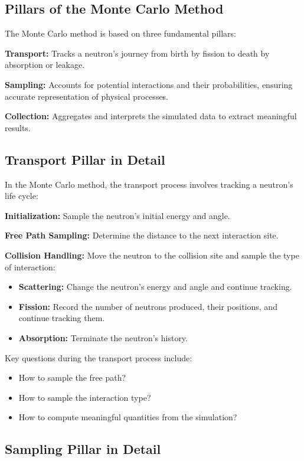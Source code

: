 \subsection{Pillars of the Monte Carlo Method}

The Monte Carlo method is based on three fundamental pillars:

\textbf{Transport:} Tracks a neutron's journey from birth by fission to death by absorption or leakage.

\textbf{Sampling:} Accounts for potential interactions and their probabilities, ensuring accurate representation of physical processes.

\textbf{Collection:} Aggregates and interprets the simulated data to extract meaningful results.

\subsection{Transport Pillar in Detail}

In the Monte Carlo method, the transport process involves tracking a neutron's life cycle:

\textbf{Initialization:} Sample the neutron's initial energy and angle.

\textbf{Free Path Sampling:} Determine the distance to the next interaction site.

\textbf{Collision Handling:} Move the neutron to the collision site and sample the type of interaction:
\begin{itemize}
\item \textbf{Scattering:} Change the neutron's energy and angle and continue tracking.
\item \textbf{Fission:} Record the number of neutrons produced, their positions, and continue tracking them.
\item \textbf{Absorption:} Terminate the neutron's history.
\end{itemize}

Key questions during the transport process include:
\begin{itemize}
\item How to sample the free path?
\item How to sample the interaction type?
\item How to compute meaningful quantities from the simulation?
\end{itemize}

\subsection{Sampling Pillar in Detail}


